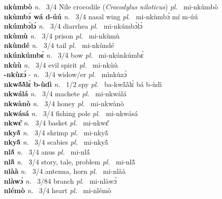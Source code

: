 {\bfseries nkùmbò}  {\itshape n.~} 3/4 Nile crocodile ({\itshape Crocodylus niloticus}) {\itshape pl.~} mi-nkùmbò    \\ 
{\bfseries nkùmbɔ́ wá d-úú}  {\itshape n.~} 3/4 nasal wing {\itshape pl.~} mi-nkùmbɔ́ mí m-úú    \\ 
{\bfseries nkúmbɔ̀lɔ́}  {\itshape n.~} 3/4 diarrhea {\itshape pl.~} mi-nkúmbɔ̀lɔ́    \\ 
{\bfseries nkùmù}  {\itshape n.~} 3/4 prison {\itshape pl.~} mi-nkùmù    \\ 
{\bfseries nkùndé}  {\itshape n.~} 3/4 tail {\itshape pl.~} mi-nkùndé    \\ 
{\bfseries nkúnkúmbɛ́}  {\itshape n.~} 3/4 bow {\itshape pl.~} mi-nkúnkúmbɛ́    \\ 
{\bfseries nkùù}  {\itshape n.~} 3/4 evil spirit {\itshape pl.~} mi-nkùù    \\ 
{\bfseries -nkùzɔ́} - {\itshape n.~} 3/4 widow/er {\itshape pl.~} mìnkùzɔ́    \\ 
{\bfseries nkwã́ã̀lɛ̀ b-ùdì}  {\itshape n.~} 1/2 spy {\itshape pl.~} ba-kwã́ã̀lɛ̀ bá b-ùdì    \\ 
{\bfseries nkwálá}  {\itshape n.~} 3/4 machete {\itshape pl.~} mi-nkwálá    \\ 
{\bfseries nkwànò}  {\itshape n.~} 3/4 honey {\itshape pl.~} mi-nkwànò    \\ 
{\bfseries nkwásá}  {\itshape n.~} 3/4 fishing pole {\itshape pl.~} mi-nkwásá    \\ 
{\bfseries nkwɛ̌}  {\itshape n.~} 3/4 basket {\itshape pl.~} mi-nkwɛ̌    \\ 
{\bfseries nkyã́}  {\itshape n.~} 3/4 shrimp {\itshape pl.~} mi-nkyã́    \\ 
{\bfseries nkyã̂}  {\itshape n.~} 3/4 scabies {\itshape pl.~} mi-nkyã̂    \\ 
{\bfseries nlã́}  {\itshape n.~} 3/4 anus {\itshape pl.~} mi-nlã́    \\ 
{\bfseries nlã̂}  {\itshape n.~} 3/4 story, tale, problem {\itshape pl.~} mi-nlã̂    \\ 
{\bfseries nlàà}  {\itshape n.~} 3/4 antenna, horn {\itshape pl.~} mi-nlàà    \\ 
{\bfseries nlàwɔ́}  {\itshape n.~} 3/84 branch {\itshape pl.~} mi-nlàwɔ́    \\ 
{\bfseries nlémò}  {\itshape n.~} 3/4 heart {\itshape pl.~} mi-nlémò    \\ 
